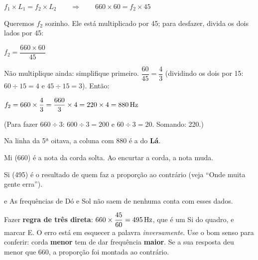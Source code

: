 \begin{conta}
$f_1 \times L_1 = f_2 \times L_2 \qquad\Rightarrow\qquad 660 \times 60 = f_2 \times 45$
\end{conta}

Queremos $f_2$ sozinho. Ele está multiplicado por 45; para desfazer, divida os dois lados por 45:
\begin{conta}
$f_2 = \dfrac{660 \times 60}{45}$
\end{conta}
Não multiplique ainda: simplifique primeiro. $\dfrac{60}{45} = \dfrac{4}{3}$ (dividindo os dois por 15: $60 \div 15 = 4$ e $45 \div 15 = 3$). Então:
\begin{conta}
$f_2 = 660 \times \dfrac{4}{3} = \dfrac{660}{3} \times 4 = 220 \times 4 = 880\,\text{Hz}$
\end{conta}
(Para fazer $660 \div 3$: $600 \div 3 = 200$ e $60 \div 3 = 20$. Somando: 220.)

Na linha da 5ª oitava, a coluna com 880 é a do \textbf{Lá}.


\begin{outras}
 Mi (660) é a nota da corda solta. Ao encurtar a corda, a nota muda.\par
{} Si (495) é o resultado de quem faz a proporção ao contrário (veja ``Onde muita gente erra'').\par
{} e  As frequências de Dó e Sol não saem de nenhuma conta com esses dados.
\end{outras}

\begin{pegadinha}
Fazer \textbf{regra de três direta}: $660 \times \dfrac{45}{60} = 495\,\text{Hz}$, que é um Si do quadro, e marcar E.
O erro está em esquecer a palavra \emph{inversamente}. Use o bom senso para conferir: corda \textbf{menor} tem de dar
frequência \textbf{maior}. Se a sua resposta deu menor que 660, a proporção foi montada ao contrário.
\end{pegadinha}
